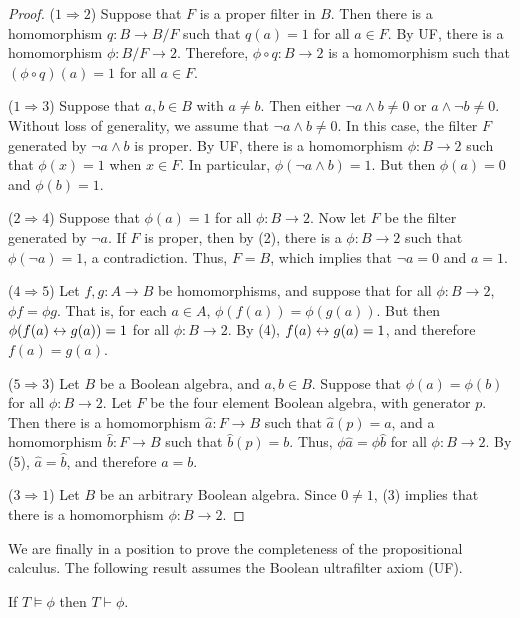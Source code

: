 \begin{proof} ($1\Rightarrow 2$) Suppose that $F$ is a proper filter
  in $B$.  Then there is a homomorphism $q:B\to B/F$ such that
  $q(a)=1$ for all $a\in F$.  By UF, there is a homomorphism $\phi
  :B/F\to 2$.  Therefore, $\phi \circ q:B\to 2$ is a homomorphism such
  that $(\phi \circ q)(a)=1$ for all $a\in F$.

  \bigskip ($1\Rightarrow 3$) Suppose that $a,b\in B$ with $a\neq b$.
  Then either $\neg a\wedge b\neq 0$ or $a\wedge \neg b\neq 0$.
  Without loss of generality, we assume that $\neg a\wedge b\neq 0$.
  In this case, the filter $F$ generated by $\neg a\wedge b$ is
  proper.  By UF, there is a homomorphism $\phi :B\to 2$ such that
  $\phi (x)=1$ when $x\in F$.  In particular, $\phi (\neg a\wedge
  b)=1$.  But then $\phi (a)=0$ and $\phi (b)=1$.

  \bigskip ($2\Rightarrow 4$) Suppose that $\phi (a)=1$ for all $\phi
  :B\to 2$.  Now let $F$ be the filter generated by $\neg a$.  If $F$
  is proper, then by (2), there is a $\phi :B\to 2$ such that $\phi
  (\neg a)=1$, a contradiction.  Thus, $F=B$, which implies that $\neg
  a=0$ and $a=1$.

  \bigskip ($4\Rightarrow 5$) Let $f,g:A\to B$ be homomorphisms, and
  suppose that for all $\phi :B\to 2$, $\phi f=\phi g$.  That is, for
  each $a\in A$, $\phi (f(a))=\phi (g(a))$.  But then $\phi (f(a)\leftrightarrow
  g(a))=1$ for all $\phi :B\to 2$.  By (4), $f(a)\leftrightarrow g(a)=1$, and
  therefore $f(a)=g(a)$.

  \bigskip ($5\Rightarrow 3$) Let $B$ be a Boolean algebra, and
  $a,b\in B$.  Suppose that $\phi (a)=\phi (b)$ for all $\phi :B\to
  2$.  Let $F$ be the four element Boolean algebra, with generator
  $p$.  Then there is a homomorphism $\hat{a}:F\to B$ such that
  $\hat{a}(p)=a$, and a homomorphism $\hat{b}:F\to B$ such that
  $\hat{b}(p)=b$.  Thus, $\phi \hat{a}=\phi \hat{b}$ for all $\phi
  :B\to 2$.  By (5), $\hat{a}=\hat{b}$, and therefore $a=b$.

  \bigskip ($3\Rightarrow 1$) Let $B$ be an arbitrary Boolean algebra.
  Since $0\neq 1$, (3) implies that there is a homomorphism $\phi
  :B\to 2$.
\end{proof}

We are finally in a position to prove the completeness of the
propositional calculus.  The following result assumes the Boolean
ultrafilter axiom (UF).

\begin{box-thm} If $T\vDash \phi$ then $T\vdash
  \phi$. \end{box-thm} \label{page:complete}

